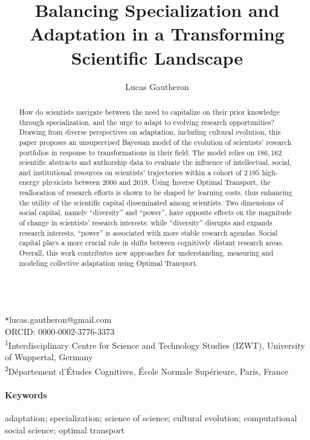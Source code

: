 \documentclass{article}
\title{Balancing Specialization and Adaptation in a Transforming Scientific Landscape}
\author{Lucas Gautheron\protect\affmark[1,2]}
\date{}
\newcommand*{\affaddr}[1]{#1}
\newcommand*{\affmark}[1][*]{\textsuperscript{#1}}
\newcommand*{\email}[1][*]{\texttt{#1}}
\begin{document}
\maketitle


\begin{abstract}
How do scientists navigate between the need to capitalize on their prior knowledge through specialization, and the urge to adapt to evolving research opportunities? Drawing from diverse perspectives on adaptation, including cultural evolution, this paper proposes an unsupervised Bayesian model of the evolution of scientists' research portfolios in response to transformations in their field. The model relies on $186,162$ scientific abstracts and authorship data to evaluate the influence of intellectual, social, and institutional resources on scientists' trajectories within a cohort of $2\,195$ high-energy physicists between 2000 and 2019. Using Inverse Optimal Transport, the reallocation of research efforts is shown to be shaped by learning costs, thus enhancing the utility of the scientific capital disseminated among scientists. Two dimensions of social capital, namely ``diversity'' and ``power'', have opposite effects on the magnitude of change in scientists' research interests: while ``diversity'' disrupts and expands research interests, ``power'' is associated with more stable research agendas. Social capital plays a more crucial role in shifts between cognitively distant research areas. Overall, this work contributes new approaches for understanding, measuring and modeling collective adaptation using Optimal Transport.
    
\end{abstract}


\ \\

  \email{lucas.gautheron@gmail.com}\\ORCID: 0000-0002-3776-3373\\
 \affaddr{\affmark[1]Interdisciplinary Centre for Science and Technology Studies (IZWT), University of Wuppertal, Germany}\\
 \affaddr{\affmark[2]Département d'Études Cognitives, École Normale Supérieure, Paris, France}

 \paragraph{Keywords}{adaptation; specialization; science of science;  cultural evolution; computational social science; optimal transport}
\end{document}
